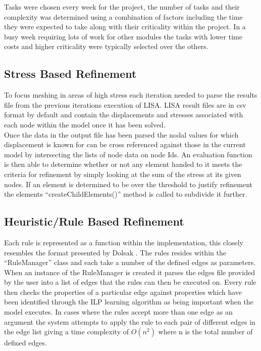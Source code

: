 \noindent
Tasks were chosen every week for the project, the number of tasks and their complexity was determined using a combination of factors including the time they were expected to take along with their criticality within the project. In a busy week requiring lots of work for other modules the tasks with lower time costs and higher criticality were typically selected over the others.

\subsection{Stress Based Refinement}
To focus meshing in areas of high stress each iteration needed to parse the results file from the previous iterations execution of LISA. LISA result files are in csv format by default and contain the displacements and stresses associated with each node within the model once it has been solved. \\

\noindent
Once the data in the output file has been parsed the nodal values for which displacement is known for can be cross referenced against those in the current model by intersecting the lists of node data on node Ids. An evaluation function is then able to determine whether or not any element handed to it meets the criteria for refinement by simply looking at the sum of the stress at its given nodes. If an element is determined to be over the threshold to justify refinement the elements ``createChildElements()'' method is called to subdivide it further. \\


\subsection{Heuristic/Rule Based Refinement}
Each rule is represented as a function within the implementation, this closely resembles the format presented by Dolsak \cite{DolsakPaper91, DolsakPaper94, appOfILPToFEMeshDesign, ConsultRuleIntellSystemFE}. The rules resides within the ``RuleManager'' class and each take a number of the defined edges as parameters. When an instance of the RuleManager is created it parses the edges file provided by the user into a list of edges that the rules can then be executed on. Every rule then checks the properties of a particular edge against properties which have been identified through the ILP learning algorithm as being important when the model executes. In cases where the rules accept more than one edge as an argument the system attempts to apply the rule to each pair of different edges in the edge list giving a time complexity of $O(n^2)$ where n is the total number of defined edges.\\


